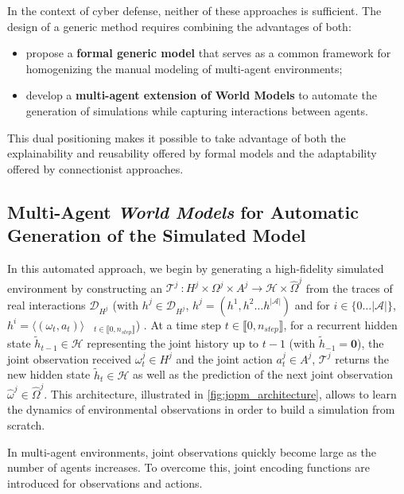 In the context of cyber defense, neither of these approaches is sufficient. The design of a generic method requires combining the advantages of both:
\begin{itemize}
  \item propose a \textbf{formal generic model} that serves as a common framework for homogenizing the manual modeling of multi-agent environments;
  \item develop a \textbf{multi-agent extension of World Models} to automate the generation of simulations while capturing interactions between agents.
\end{itemize}

This dual positioning makes it possible to take advantage of both the explainability and reusability offered by formal models and the adaptability offered by connectionist approaches.


\subsection{Multi-Agent \textit{World Models} for Automatic Generation of the Simulated Model}

In this automated approach, we begin by generating a high-fidelity simulated environment by constructing an  $\mathcal{T}^j~: H^j \times \Omega^j \times A^j \rightarrow \mathcal{H} \times \hat{\Omega}^j$ from the traces of real interactions $\mathcal{D}_{H^j}$ (with $h^j \in \mathcal{D}_{H^j}$, $h^j = (h^1, h^2 \dots h^{|\mathcal{A}|})$ and for $i \in \{0\dots|\mathcal{A}|\}$, $h^i = \langle (\omega_t, a_t) \rangle\phantom{X}_{t \in \llbracket 0, n_{step} \rrbracket}$) . At a time step $t \in \llbracket 0, n_{step} \rrbracket$, for a recurrent hidden state $\tilde{h}_{t-1} \in \mathcal{H}$ representing the joint history up to $t-1$ (with $\tilde{h}_{-1} = \mathbf{0}$), the joint observation received $\omega_t^j \in H^j$ and the joint action $a_t^j \in A^j$,  $\mathcal{T}^j$ returns the new hidden state $\tilde{h}_t \in \mathcal{H}$ as well as the prediction of the next joint observation $\hat{\omega}^j \in \hat {\Omega}^j$. This architecture, illustrated in \autoref{fig:jopm_architecture}, allows  to learn the dynamics of environmental observations in order to build a simulation from scratch.

In multi-agent environments, joint observations quickly become large as the number of agents increases. To overcome this, joint encoding functions are introduced for observations and actions.

